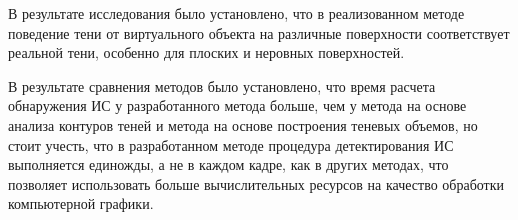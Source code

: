 В результате исследования было установлено, что в реализованном методе поведение тени от виртуального объекта на различные поверхности соответствует реальной тени, особенно для плоских и неровных поверхностей.

В результате сравнения методов было установлено, что время расчета обнаружения ИС у разработанного метода больше, чем у метода на основе анализа контуров теней и метода на основе построения теневых объемов, но стоит учесть, что в разработанном методе процедура детектирования ИС выполняется единожды, а не в каждом кадре, как в других методах, что позволяет использовать больше вычислительных ресурсов на качество обработки компьютерной графики.